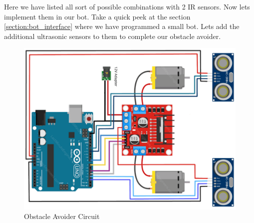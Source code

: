 \vspace{2cm}
Here we have listed all sort of possible combinations with 2 IR sensors. Now lets implement them in our bot. Take a quick peek at the section \ref{section:bot_interface} where we have programmed a small bot. Lets add the additional ultrasonic sensors to them to complete our obstacle avoider.

\begin{figure}
    \centering
    \includegraphics{Images/Ultrasonic/obj_avoider_ckt.png}
     \caption{Obstacle Avoider Circuit}
\end{figure}


